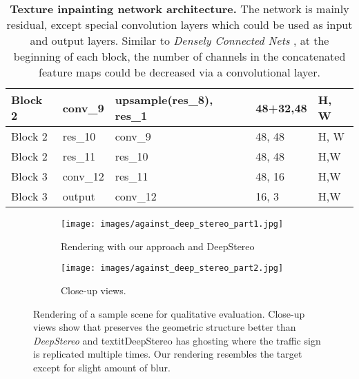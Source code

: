 \documentclass[runningheads]{llncs}
\newcommand{\squeezeup}{\vspace{-5.5mm}}
\begin{document}
\begin{table}[htb!]
\begin{tabular}{|l|l|l|l|l|}
Block 2                              & conv\_9        & upsample(res\_8),  res\_1        & 48+32,48                                                               & H, W                 \\ \hline
Block 2                              & res\_10        & conv\_9                          & 48, 48                                                                 & H, W                 \\ \hhline{|=|=|=|=|=|}
Block 2                              & res\_11        & res\_10                          & 48, 48                                                                 & H,W                  \\ \hline
Block 3                              & conv\_12       & res\_11                          & 48, 16                                                                 & H,W                  \\ \hline
Block 3                              & output         & conv\_12                         & 16, 3                                                                  & H,W                  \\ \hline
\end{tabular}


\caption{\textbf{Texture inpainting network architecture.} The network is mainly residual, except special convolution layers which could be used as input and output layers. Similar to \textit{Densely Connected Nets} \cite{huang2017densely}, at the beginning of each block, the number of channels in the concatenated feature maps could be decreased via a convolutional layer.}
\label{tabel:texture_network}
\end{table}
\squeezeup

\begin{figure}[htb!]
  \centering
  \begin{subfigure}{\linewidth}
    \centering
    \texttt{[image: images/against\_deep\_stereo\_part1.jpg]}
    \caption{Rendering with our approach and DeepStereo \cite{flynn2015deepstereo} }
  \end{subfigure}
\vspace{0.5cm}
  \begin{subfigure}{\linewidth}
    \centering
    \texttt{[image: images/against\_deep\_stereo\_part2.jpg]}
    \caption{Close-up views.}
  \end{subfigure}
  \caption{Rendering of a sample scene for qualitative evaluation. Close-up views show that preserves the geometric structure better than \textit{DeepStereo} and textit{DeepStereo} has ghosting where the traffic sign is replicated multiple times. Our rendering resembles the target except for slight amount of blur.}
  \label{fig:qualitative}
\end{figure}
\squeezeup
\end{document}
